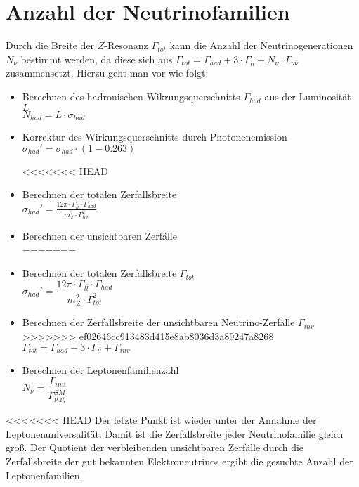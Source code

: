 \documentclass{include/thesisclass3}
\newcommand{\cc}{\cdot}
\begin{document}
\section{Anzahl der Neutrinofamilien}
Durch die Breite der $Z$-Resonanz $\Gamma_{tot}$ kann die Anzahl der Neutrinogenerationen $N_\nu$ bestimmt werden, da diese sich aus $\Gamma_{tot} = \Gamma_{had} + 3 \cc \Gamma_{l \bar l} + N_\nu \cc \Gamma_{\nu \bar \nu}$ zusammensetzt. Hierzu geht man vor wie folgt:\\
\begin{itemize}
\item Berechnen des hadronischen Wikrungsquerschnitts $\Gamma_{had}$ aus der Luminosität $L$\\
$N_{had}=L\cdot \sigma_{had}$

\item Korrektur des Wirkungsquerschnitts durch Photonenemission\\
$\sigma_{had}'=\sigma_{had}\cdot(1-0.263) $

<<<<<<< HEAD
\item Berechnen der totalen Zerfallsbreite\\
$\sigma_{had}'=\frac{12 \pi \cdot \Gamma_{l\bar{l}}\cdot \Gamma_{had}}{m_Z^2\cdot \Gamma_{tot}^2}$
\item Berechnen  der unsichtbaren Zerfälle\\
=======
\item Berechnen der totalen Zerfallsbreite $\Gamma_{tot}$\\
$\sigma_{had}'=\dfrac{12 \pi \cdot \Gamma_{l\bar{l}}\cdot \Gamma_{had}}{m_Z^2\cdot \Gamma_{tot}^2}$
\item Berechnen der Zerfallsbreite der unsichtbaren Neutrino-Zerfälle $\Gamma_{inv}$\\
>>>>>>> ef02646cc913483d415e8ab8036d3a89247a8268
$\Gamma_{tot} = \Gamma_{had} + 3 \cc \Gamma_{l \bar l} + \Gamma_{inv}$

\item Berechnen der Leptonenfamilienzahl\\
$N_\nu=\dfrac{\Gamma_{inv}}{\Gamma_{\nu_e\bar{\nu_e}}^{SM}}$
\end{itemize}
<<<<<<< HEAD
Der letzte Punkt ist wieder unter der Annahme der Leptonenuniversalität. Damit ist die Zerfallsbreite jeder Neutrinofamilie gleich groß. Der Quotient der verbleibenden unsichtbaren Zerfälle durch die Zerfallsbreite der gut bekannten Elektroneutrinos ergibt die gesuchte Anzahl der Leptonenfamilien.
\end{document}
